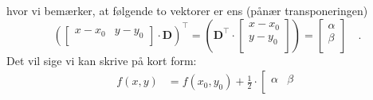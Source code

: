 \begin{bevis}
\begin{equation}
\end{equation}
hvor vi bemærker, at følgende to vektorer er ens (pånær transponeringen)
\begin{equation}
\left( \left[
                                          \begin{array}{cc}
                                            x-x_{0} & y-y_{0} \\
                                          \end{array}
                                        \right] \cdot \mathbf{D}\right)^{\top} =
                                         \left( \mathbf{D}^{\top}  \cdot \left[
                                                                                   \begin{array}{c}
                                                                                         x-x_{0}  \\
                                                                                         y-y_{0}  \\
                                                                                   \end{array}                                                                                \right] \right) = \left[
                                                                                                       \begin{array}{c}
                                                                                                         \alpha \\
                                                                                                         \beta \\
                                                                                                       \end{array}
                                                                                                     \right] \quad .
\end{equation}
Det vil sige vi kan skrive på kort form:
\begin{equation} \label{eqAlpBet}
\begin{aligned}
f(x,y) &= f(x_{0}, y_{0}) + \frac{1}{2}\cdot \left[
                                          \begin{array}{cc}
                                            \alpha & \beta \\
                                          \end{array}

\end{aligned}
\end{equation}
\end{bevis}
